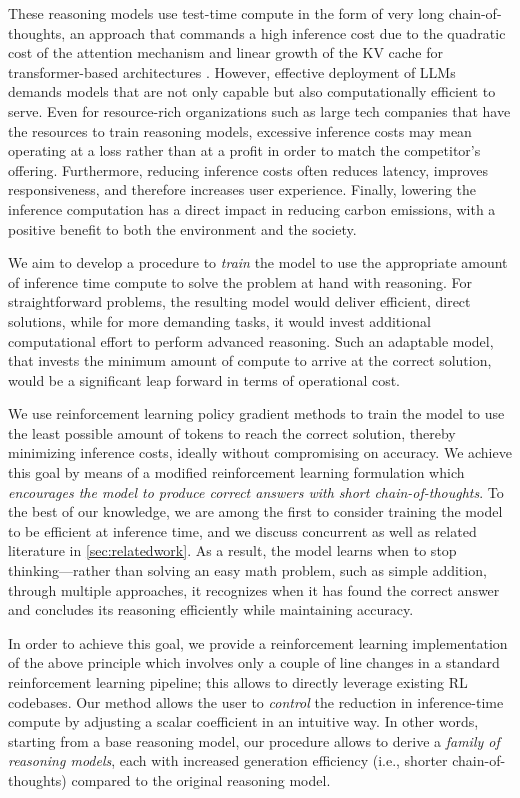 These reasoning models use test-time compute in the form of very long chain-of-thoughts, an approach that commands a high inference cost due to the quadratic cost of the attention mechanism and linear growth of the KV cache for transformer-based architectures \cite{vaswani2017attention}. However, effective deployment of LLMs demands models that are not only capable but also computationally efficient to serve. 
Even for resource-rich organizations such as large tech companies that have the resources to train reasoning models, excessive inference costs may mean operating at a loss rather than at a profit in order to match the competitor's offering.
Furthermore, reducing inference costs often reduces latency, improves responsiveness, and therefore increases user experience. Finally, lowering the inference computation has a direct impact in reducing carbon emissions, with a positive benefit to both the environment and the society.

We aim to develop a procedure to \emph{train} the model to use the appropriate amount of inference time compute to solve the problem at hand with reasoning.
For straightforward problems, the resulting model would deliver efficient, direct solutions, while for more demanding tasks, it would invest additional computational effort to perform advanced reasoning. Such an adaptable model, that invests the minimum amount of compute to arrive at the correct solution, would be a significant leap forward in terms of operational cost.

We  use reinforcement learning policy gradient methods \citep{sutton2018reinforcement} to train the model to use the least possible amount of tokens to reach the correct solution, thereby minimizing inference costs, ideally without compromising on accuracy. 
We achieve this goal by means of a modified reinforcement learning formulation which \emph{encourages the model to produce correct answers with short chain-of-thoughts}.
To the best of our knowledge, we are among the first to consider training the model to be efficient at inference time, and
we discuss concurrent as well as related  literature in \cref{sec:relatedwork}. 
As a result, the model learns when to stop thinking—rather than solving an easy math problem, such as simple addition, through multiple approaches, it recognizes when it has found the correct answer and concludes its reasoning efficiently while maintaining accuracy.

In order to achieve this goal, we provide a reinforcement learning implementation of the above principle which involves only a couple of line changes in a standard reinforcement learning pipeline; this allows to directly leverage existing RL codebases.
Our method allows the user to  \emph{control} the reduction in inference-time compute by adjusting a scalar coefficient in an intuitive way. In other words, 
starting from a base reasoning model, our procedure allows to derive a \emph{family of reasoning models}, each with increased generation efficiency (i.e., shorter chain-of-thoughts) compared to the original reasoning model. 


